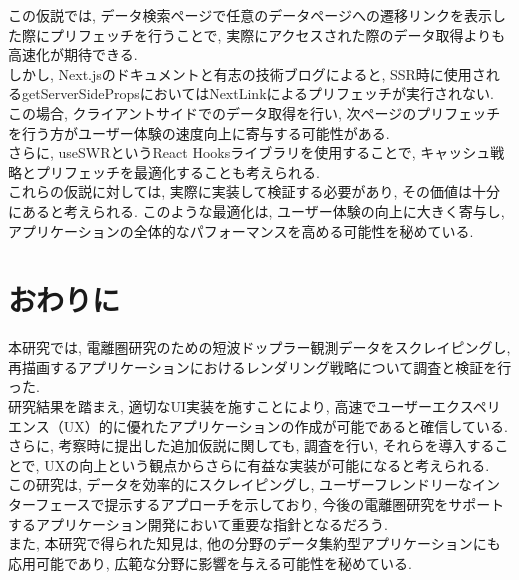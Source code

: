この仮説では, データ検索ページで任意のデータページへの遷移リンクを表示した際にプリフェッチを行うことで, 実際にアクセスされた際のデータ取得よりも高速化が期待できる. \\
しかし, Next.jsのドキュメントと有志の技術ブログによると, SSR時に使用されるgetServerSidePropsにおいてはNextLinkによるプリフェッチが実行されない. 
この場合, クライアントサイドでのデータ取得を行い, 次ページのプリフェッチを行う方がユーザー体験の速度向上に寄与する可能性がある.\cite{no9} \\
さらに, useSWRというReact Hooksライブラリを使用することで, キャッシュ戦略とプリフェッチを最適化することも考えられる.\cite{no10} \\
これらの仮説に対しては, 実際に実装して検証する必要があり, その価値は十分にあると考えられる. 
このような最適化は, ユーザー体験の向上に大きく寄与し, アプリケーションの全体的なパフォーマンスを高める可能性を秘めている. 


\section{おわりに}
本研究では, 電離圏研究のための短波ドップラー観測データをスクレイピングし, 再描画するアプリケーションにおけるレンダリング戦略について調査と検証を行った. \\
研究結果を踏まえ, 適切なUI実装を施すことにより, 高速でユーザーエクスペリエンス（UX）的に優れたアプリケーションの作成が可能であると確信している. 
さらに, 考察時に提出した追加仮説に関しても, 調査を行い, それらを導入することで, UXの向上という観点からさらに有益な実装が可能になると考えられる. \\
この研究は, データを効率的にスクレイピングし, ユーザーフレンドリーなインターフェースで提示するアプローチを示しており, 今後の電離圏研究をサポートするアプリケーション開発において重要な指針となるだろう. \\
また, 本研究で得られた知見は, 他の分野のデータ集約型アプリケーションにも応用可能であり, 広範な分野に影響を与える可能性を秘めている. 

